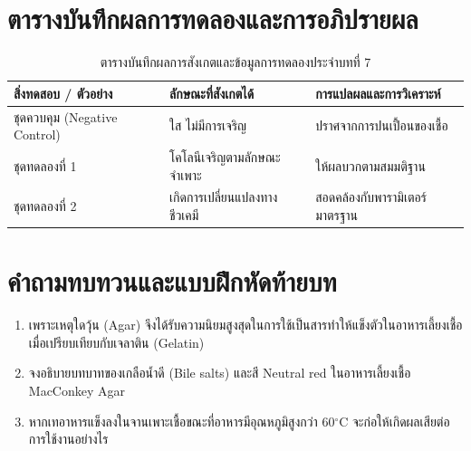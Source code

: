 \section{ตารางบันทึกผลการทดลองและการอภิปรายผล}
\begin{table}[H]
\centering\small
\caption{ตารางบันทึกผลการสังเกตและข้อมูลการทดลองประจำบทที่ 7}
\label{tab:ch07_datasheet}
\begin{tabularx}{\textwidth}{p{} p{} X}
\toprule
\textbf{สิ่งทดสอบ / ตัวอย่าง} & \textbf{ลักษณะที่สังเกตได้} & \textbf{การแปลผลและการวิเคราะห์} \\
\midrule
ชุดควบคุม (Negative Control) & ใส ไม่มีการเจริญ & ปราศจากการปนเปื้อนของเชื้อ \\
ชุดทดลองที่ 1 & โคโลนีเจริญตามลักษณะจำเพาะ & ให้ผลบวกตามสมมติฐาน \\
ชุดทดลองที่ 2 & เกิดการเปลี่ยนแปลงทางชีวเคมี & สอดคล้องกับพารามิเตอร์มาตรฐาน \\
\bottomrule
\end{tabularx}
\end{table}

\section{คำถามทบทวนและแบบฝึกหัดท้ายบท}
\begin{enumerate}
    \item เพราะเหตุใดวุ้น (Agar) จึงได้รับความนิยมสูงสุดในการใช้เป็นสารทำให้แข็งตัวในอาหารเลี้ยงเชื้อ เมื่อเปรียบเทียบกับเจลาติน (Gelatin)
    \item จงอธิบายบทบาทของเกลือน้ำดี (Bile salts) และสี Neutral red ในอาหารเลี้ยงเชื้อ MacConkey Agar
    \item หากเทอาหารแข็งลงในจานเพาะเชื้อขณะที่อาหารมีอุณหภูมิสูงกว่า 60$^{\circ}$C จะก่อให้เกิดผลเสียต่อการใช้งานอย่างไร
\end{enumerate}
